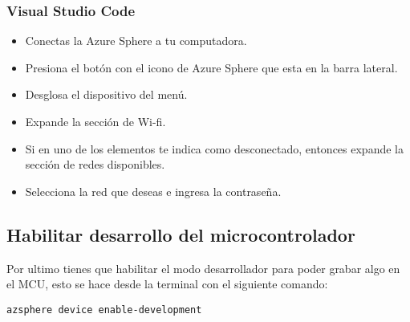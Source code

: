 \subsubsection{Visual Studio Code}
\begin{itemize}
	\item
	Conectas la Azure Sphere a tu computadora.
	\item 
	Presiona el botón con el icono de Azure Sphere que esta en la barra lateral.
	\item 
	Desglosa el dispositivo del menú. 
	\item 
	Expande la sección de Wi-fi.
	\item 
	Si en uno de los elementos te indica como desconectado, entonces expande la sección de redes disponibles.
	\item 
	Selecciona la red que deseas e ingresa la contraseña.
\end{itemize}

\subsection{Habilitar desarrollo del microcontrolador}
Por ultimo tienes que habilitar el modo desarrollador para poder grabar algo en el MCU, esto se hace desde la terminal con el siguiente comando:
\begin{verbatim}
azsphere device enable-development
\end{verbatim}
